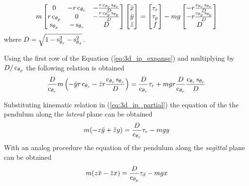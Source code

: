 \begin{equation}
  \label{eq:3d_ip_expanse}
  m
  \begin{bmatrix}
    0 & -r \cosine{\theta_r} & -\frac{r \cosine{\theta_r} \sine{\theta_r}}{D}\\
    r\cosine{\theta_p} & 0 &-\frac{r \cosine{\theta_p} \sine{\theta_p}}{D}\\
    \sine{\theta_p} & -\sine{\theta_r} & D
  \end{bmatrix}
  \begin{bmatrix}
    \ddot{x}\\
    \ddot{y}\\
    \ddot{z}
  \end{bmatrix} =
  \begin{bmatrix}
    \tau_r\\
    \tau_p\\
    f
  \end{bmatrix}
  - mg
  \begin{bmatrix}
    - r \frac{\cosine{\theta_r} \sine{\theta_r}}{D}\\
    - r \frac{\cosine{\theta_p} \sine{\theta_p}}{D}\\
    D
  \end{bmatrix}
\end{equation}
where $D = \sqrt{1 - \mathop{}\!\mathrm{s}_{\theta_r} ^ 2 - \mathop{}\!\mathrm{s}_{\theta_d} ^ 2}$.
\par
Using the first row of the Equation (\ref{eq:3d_ip_expanse}) and multiplying by $D / \mathop{}\!\mathrm{c}_{\theta_p}$ the following relation is obtained
\begin{equation}
  \label{eq:3d_ip_partial}
  \frac{D}{\cosine{\theta_r}} m \left(-\ddot{y} r \cosine{\theta_r} - \ddot{z} r\frac{\cosine{\theta_r}\sine{\theta_r}}{D} \right ) =  \frac{D}{\cosine{\theta_r}} \tau_r + m g r \frac{D}{\cosine{\theta_r}}  \frac{\cosine{\theta_r} \sine{\theta_r}}{D} 
\end{equation}
\par
Substituting kinematic relation in (\ref{eq:3d_ip_partial}) the equation of the the pendulum along
the \emph{lateral} plane can be obtained
\begin{equation}
  \label{eq:3d_ip_y}
  m(-z \ddot{y} + \ddot{z} y) = \frac{D}{\mathop{}\!\mathrm{c}_{\theta_r}} \tau_r - m g y 
\end{equation}
With an analog procedure the equation of the pendulum along the \emph{sagittal} plane can be obtained
\begin{equation}
  \label{eq:3d_ip_x}
  m(z \ddot{x} - \ddot{z} x) = \frac{D}{\mathop{}\!\mathrm{c}_{\theta_p}} \tau_d - m g x 
\end{equation}

